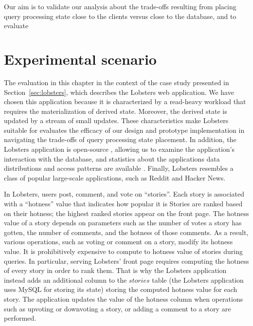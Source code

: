 
Our aim is to validate our analysis about the trade-offs resulting from placing query processing state close to the clients
versus close to the database,
and to evaluate



\section{Experimental scenario}

The evaluation in this chapter in the context of the case study presented in Section~\ref{sec:lobsters},
which describes the Lobsters \cite{lobste:rs} web application.
We have chosen this application because it is characterized by a read-heavy workload that requires the materialization
of derived state.
Moreover, the derived state is updated by a stream of small updates.
These characteristics make Lobsters suitable for evaluates the efficacy of our design and prototype implementation in
navigating the trade-offs of query processing state placement.
In addition, the Lobsters application is open-source \cite{lobsters:source},
allowing us to examine the application's interaction with the database,
and statistics about the applications data distributions and access patterns are available \cite{lobste:stats}.
Finally, Lobsters resembles a class of popular large-scale applications, such as Reddit and Hacker News.

\bigskip
\noindent
In Lobsters, users post, comment, and vote on ``stories''.
Each story is associated with a ``hotness'' value that indicates how popular it is
Stories are ranked based on their hotness;
the highest ranked stories appear on the front page.
The hotness value of a story depends on parameters such as the number of votes a story has gotten,
the number of comments, and the hotness of those comments.
As a result, various operations, such as voting or comment on a story, modify its hotness value.
It is prohibitively expensive \cite{gjengset:noria} to compute to hotness value of stories during queries.
In particular, serving Lobsters' front page requires computing the hotness of every story in order to rank them.
That is why the Lobsters application instead adds an additional column to the $stories$ table (the Lobsters application
uses MySQL for storing its state) storing the computed hotness value for each story.
The application updates the value of the hotness column when operations such as upvoting or downvoting a story, or
adding a comment to a story are performed.

